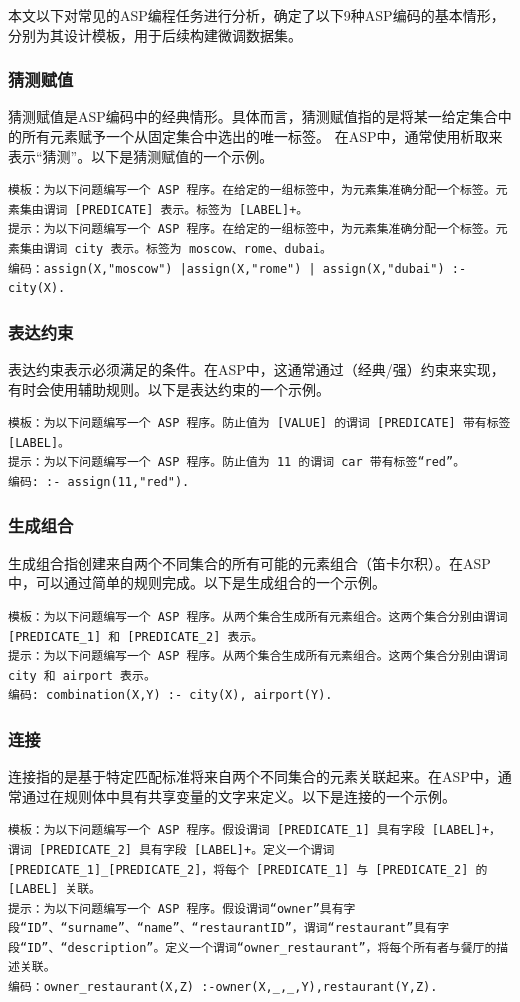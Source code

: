 本文以下对常见的ASP编程任务进行分析，确定了以下9种ASP编码的基本情形，分别为其设计模板，用于后续构建微调数据集。
\subsubsection{猜测赋值}
猜测赋值是ASP编码中的经典情形。具体而言，猜测赋值指的是将某一给定集合中的所有元素赋予一个从固定集合中选出的唯一标签。
在ASP中，通常使用析取来表示“猜测”。以下是猜测赋值的一个示例。
\begin{lstlisting}
模板：为以下问题编写一个 ASP 程序。在给定的一组标签中，为元素集准确分配一个标签。元素集由谓词 [PREDICATE] 表示。标签为 [LABEL]+。
提示：为以下问题编写一个 ASP 程序。在给定的一组标签中，为元素集准确分配一个标签。元素集由谓词 city 表示。标签为 moscow、rome、dubai。
编码：assign(X,"moscow") |assign(X,"rome") | assign(X,"dubai") :- city(X).
\end{lstlisting}
\subsubsection{表达约束}
表达约束表示必须满足的条件。在ASP中，这通常通过（经典/强）约束来实现，有时会使用辅助规则。以下是表达约束的一个示例。
\begin{lstlisting}
模板：为以下问题编写一个 ASP 程序。防止值为 [VALUE] 的谓词 [PREDICATE] 带有标签 [LABEL]。
提示：为以下问题编写一个 ASP 程序。防止值为 11 的谓词 car 带有标签“red”。
编码: :- assign(11,"red").
\end{lstlisting}
\subsubsection{生成组合}
生成组合指创建来自两个不同集合的所有可能的元素组合（笛卡尔积）。在ASP中，可以通过简单的规则完成。以下是生成组合的一个示例。
\begin{lstlisting}
模板：为以下问题编写一个 ASP 程序。从两个集合生成所有元素组合。这两个集合分别由谓词 [PREDICATE_1] 和 [PREDICATE_2] 表示。
提示：为以下问题编写一个 ASP 程序。从两个集合生成所有元素组合。这两个集合分别由谓词 city 和 airport 表示。
编码: combination(X,Y) :- city(X), airport(Y).
\end{lstlisting}
\subsubsection{连接}
连接指的是基于特定匹配标准将来自两个不同集合的元素关联起来。在ASP中，通常通过在规则体中具有共享变量的文字来定义。以下是连接的一个示例。
\begin{lstlisting}
模板：为以下问题编写一个 ASP 程序。假设谓词 [PREDICATE_1] 具有字段 [LABEL]+，谓词 [PREDICATE_2] 具有字段 [LABEL]+。定义一个谓词 [PREDICATE_1]_[PREDICATE_2]，将每个 [PREDICATE_1] 与 [PREDICATE_2] 的 [LABEL] 关联。
提示：为以下问题编写一个 ASP 程序。假设谓词“owner”具有字段“ID”、“surname”、“name”、“restaurantID”，谓词“restaurant”具有字段“ID”、“description”。定义一个谓词“owner_restaurant”，将每个所有者与餐厅的描述关联。
编码：owner_restaurant(X,Z) :-owner(X,_,_,Y),restaurant(Y,Z).
\end{lstlisting}
